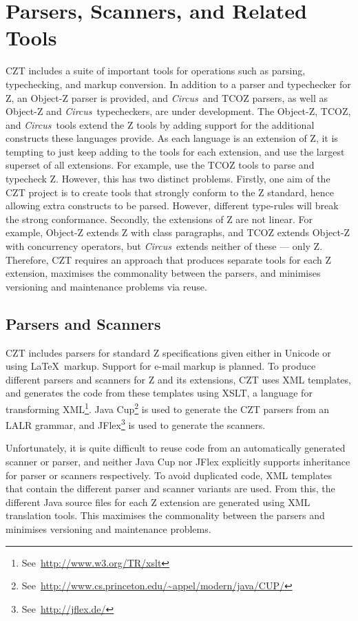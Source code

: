 \documentclass{llncs}
\newcommand{\Circus}{{\sf\slshape Circus}}
\begin{document}
\section{Parsers, Scanners, and Related Tools}
\label{parsers}

  CZT includes a suite of important tools for operations such as
  parsing, typechecking, and markup conversion. In addition to a
  parser and typechecker for Z, an Object-Z parser is provided, and
  \Circus\ and TCOZ parsers, as well as Object-Z and \Circus\
  typecheckers, are under development.  The Object-Z, TCOZ, and
  \Circus\ tools extend the Z tools by adding support for the
  additional constructs these languages provide.  As each language is an
  extension of Z, it is tempting to just keep adding to the tools
  for each extension, and use the largest superset of all
  extensions. For example, use the TCOZ tools to parse and typecheck
  Z. However, this has two distinct problems. Firstly, one aim of the
  CZT project is to create tools that strongly conform to the Z
  standard, hence allowing extra constructs to be parsed. However,
  different type-rules will break the strong conformance. Secondly, the
  extensions of Z are not linear. For example, Object-Z extends Z with
  class paragraphs, and TCOZ extends Object-Z with concurrency
  operators, but \Circus\ extends neither of these --- only
  Z. Therefore, CZT requires an approach that produces separate tools
  for each Z extension, maximises the commonality between the parsers,
  and minimises versioning and maintenance problems via reuse.

\subsection{Parsers and Scanners}

  CZT includes parsers for standard Z specifications given either in
  Unicode or using \LaTeX\ markup.  Support for e-mail markup is
  planned. To produce different parsers and scanners for Z and its
  extensions, CZT uses XML templates, and generates the code from these
  templates using XSLT, a language for transforming XML\footnote{See~\url{http://www.w3.org/TR/xslt}}. Java
  Cup\footnote{See~\url{http://www.cs.princeton.edu/~appel/modern/java/CUP/}} is
  used to generate the CZT parsers from an LALR grammar, and
  JFlex\footnote{See~\url{http://jflex.de/}} is used to generate the
  scanners.

  Unfortunately, it is quite difficult to reuse code from an
  automatically generated scanner or parser, and neither Java Cup nor
  JFlex explicitly supports inheritance for parser or scanners
  respectively.  To avoid duplicated code, XML templates that contain
  the different parser and scanner variants are used. From this, the
  different Java source files for each Z extension are generated using
  XML translation tools.  This maximises the commonality between the
  parsers and minimises versioning and maintenance problems.
\end{document}
